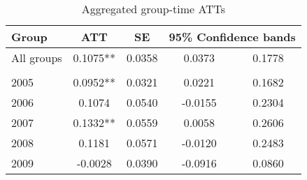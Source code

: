 \begin{table}[htbp]\centering
\caption{Aggregated group-time ATTs}
\begin{center}
\begin{tabular}{l*{4}{c}}
\toprule
\multicolumn{1}{l}{\textbf{Group}}&
\multicolumn{1}{c}{\textbf{ATT}}&
\multicolumn{1}{c}{\textbf{SE}}&
\multicolumn{2}{c}{\textbf{95\% Confidence bands}}\\
\midrule
All groups & 0.1075**& 0.0358 & 0.0373 & 0.1778 \\
\\
\midrule
  2005 &  0.0952**&      0.0321 &         0.0221  &      0.1682 \\
  2006 &   0.1074 &      0.0540 &        -0.0155  &      0.2304 \\
  2007 &   0.1332** &      0.0559  &        0.0058  &      0.2606 \\
  2008 &   0.1181 &      0.0571  &       -0.0120  &      0.2483  \\
  2009 &  -0.0028 &      0.0390  &       -0.0916   &     0.0860  \\
\bottomrule
\end{tabular}
\end{center}
\end{table}

